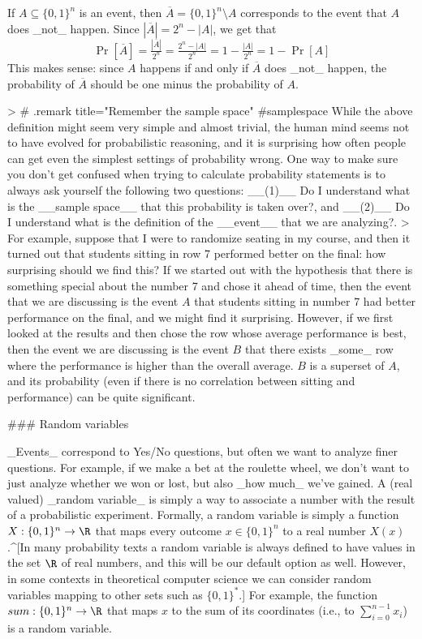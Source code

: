 If $A \subseteq \{0,1\}^n$ is an event, then $\overline{A} = \{0,1\}^n \setminus A$ corresponds to the event that $A$ does _not_ happen.
Since $|\overline{A}|=2^n-|A|$, we get that
$$\Pr[\overline{A}] = \tfrac{|\overline{A}|}{2^n} = \tfrac{2^n-|A|}{2^n}=1-\tfrac{|A|}{2^n} = 1- \Pr[A]
$$
This makes sense: since $A$ happens if and only if $\overline{A}$ does _not_ happen, the probability of $\overline{A}$ should be one minus the probability of $A$.

> # {.remark title="Remember the sample space" #samplespace}
While the above definition might seem very simple and almost trivial,  the human mind seems not to have evolved for probabilistic reasoning, and it is surprising how often people can get even the simplest settings of probability wrong.
One way to make sure you don't get confused when trying to calculate probability statements is to always ask yourself the following two questions: __(1)__ Do I understand what is the __sample space__ that this probability is taken over?, and __(2)__ Do I understand what is the definition of the __event__ that we are analyzing?.
>
For example, suppose that I were to randomize seating in my course, and then it turned out that students sitting in row 7 performed better on the final: how surprising should we find this? If we started out with the hypothesis that there is something special about the number 7 and chose it ahead of time, then the event that we are discussing is the event $A$  that students sitting in number 7 had better performance on the final, and we might find it surprising. However, if we first looked at the results and then chose the row whose average performance is best, then the event we are discussing is the event $B$ that there exists _some_  row where the performance is higher than the overall average. $B$ is a superset of $A$, and its probability (even if there is no correlation between sitting and performance) can be quite significant.



### Random variables

_Events_ correspond to Yes/No questions, but often we want to analyze finer questions.
For example, if we make a bet at the roulette wheel, we don't want to just analyze whether we won or lost, but also _how much_ we've gained.
A (real valued) _random variable_ is simply a way to associate a number with the result of a probabilistic experiment.
Formally, a random variable is simply  a function $X:\{0,1\}^n \rightarrow \R$ that maps every outcome $x\in \{0,1\}^n$ to a real number $X(x)$.^[In many probability texts a random variable is always defined to have values in the set $\R$ of real numbers, and this will be our default option as well. However, in some  contexts in theoretical computer science we can consider random variables mapping to other sets such as $\{0,1\}^*$.]
For example, the function $sum:\{0,1\}^n \rightarrow \R$ that maps $x$ to the sum of its coordinates (i.e., to $\sum_{i=0}^{n-1} x_i$) is a random variable.


